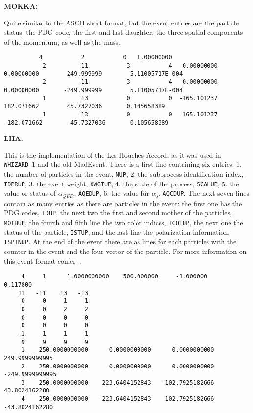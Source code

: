 \documentclass[12pt]{book}
\newcommand{\ttt}[1]{\texttt{#1}}
\newcommand{\whizard}{\texttt{WHIZARD}}
\begin{document}
{\bf MOKKA:}

Quite similar to the ASCII short format, but the event entries are the
particle status, the PDG code, the first and last daughter, the 
three spatial components of the momentum, as well as the mass.

\begin{scriptsize}
\begin{verbatim}
          4           2           0   1.00000000     
           2          11           3           4   0.00000000        0.00000000        249.999999        5.11005717E-004
           2         -11           3           4   0.00000000        0.00000000       -249.999999        5.11005717E-004
           1          13           0           0  -165.101237        182.071662        45.7327036       0.105658389     
           1         -13           0           0   165.101237       -182.071662       -45.7327036       0.105658389
\end{verbatim}
\end{scriptsize}

{\bf LHA:}

This is the implementation of the Les Houches Accord, as it was used
in \whizard\ 1 and the old MadEvent. There is a first line containing 
six entries: 1. the number of particles in the event, \ttt{NUP},
2. the subprocess identification index, \ttt{IDPRUP}, 3. the event
weight, \ttt{XWGTUP}, 4. the scale of the process, \ttt{SCALUP},
5. the value or status of $\alpha_{QED}$, \ttt{AQEDUP}, 6. the value
für $\alpha_s$, \ttt{AQCDUP}. The next seven lines contain as many
entries as there are particles in the event: the first one has the PDG
codes, \ttt{IDUP}, the next two the first and second mother of the particles,
\ttt{MOTHUP}, the fourth and fifth line the two color indices,
\ttt{ICOLUP}, the next one the status of the particle, \ttt{ISTUP},
and the last line the polarization information, \ttt{ISPINUP}. 
At the end of the event there are as lines for each particles with the
counter in the event and the four-vector of the particle. For more
information on this event format confer~\cite{LesHouches}.

\begin{scriptsize}
  \begin{verbatim}
     4     1      1.0000000000    500.000000     -1.000000      0.117800
    11   -11    13   -13
     0     0     1     1
     0     0     2     2
     0     0     0     0
     0     0     0     0
    -1    -1     1     1
     9     9     9     9
     1    250.0000000000      0.0000000000      0.0000000000    249.9999999995
     2    250.0000000000      0.0000000000      0.0000000000   -249.9999999995
     3    250.0000000000    223.6404152843   -102.7925182666     43.8024162280
     4    250.0000000000   -223.6404152843    102.7925182666    -43.8024162280    
  \end{verbatim}
\end{scriptsize}
\end{document}
